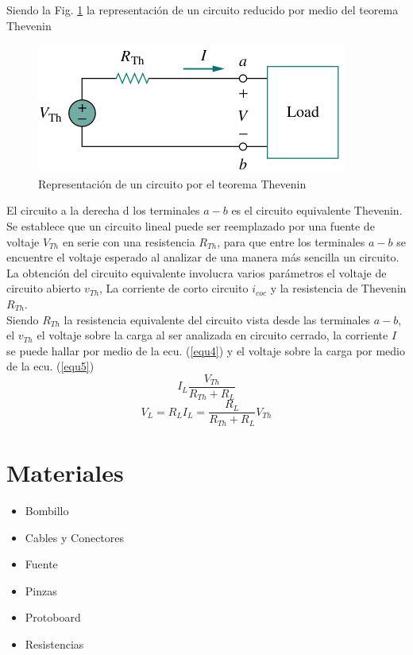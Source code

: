 \documentclass[twocolumn]{IEEEtran}
\begin{document}
\noindent
Siendo la Fig. \ref{fig2} la representación de un circuito reducido por medio del teorema Thevenin
\begin{figure}[H]
	\centering
		\includegraphics[scale=0.5]{th2.png}
	\caption{Representación de un circuito por el teorema Thevenin}
	\label{fig2}
\end{figure}
\noindent
El circuito a la derecha d los terminales $a - b$ es el circuito equivalente Thevenin.\\
Se establece que un circuito lineal puede ser reemplazado por una fuente de voltaje $V_{Th}$ en serie con una resistencia $R_{Th}$, para que entre los terminales $a - b$ se encuentre el voltaje esperado al analizar de una manera más sencilla un circuito. La obtención del circuito equivalente involucra varios parámetros el voltaje de circuito abierto $v_{Th}$, La corriente de corto circuito $i_{coc}$ y la resistencia de Thevenin $R_{Th}$.\\
Siendo $R_{Th}$ la resistencia equivalente del circuito vista desde las terminales $a - b$, el $v_{Th}$ el voltaje sobre la carga al ser analizada en circuito cerrado, la corriente $I$ se puede hallar por medio de la ecu. (\ref{equ4}) y el voltaje sobre la carga por medio de la ecu. (\ref{equ5})
\begin{equation}
 I_L\frac{V_{Th}}{R_{Th} + R_L}
 \label{equ4}
\end{equation}
\begin{equation}
 V_L = R_L I_L = \frac{R_L}{R_{Th} + R_L} V_{Th}
 \label{equ5}
\end{equation}

\section{Materiales}
\begin{itemize}
 \item Bombillo
 \item Cables y Conectores
 \item Fuente
 \item Pinzas
 \item Protoboard
 \item Resistencias
\end{itemize}
\end{document}
